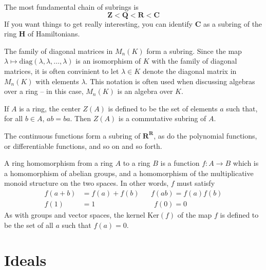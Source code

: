 \begin{example}
    The most fundamental chain of subrings is
    \[ \mathbf{Z} < \mathbf{Q} < \mathbf{R} < \mathbf{C} \]
    If you want things to get really interesting, you can identify $\mathbf{C}$ as a subring of the ring $\mathbf{H}$ of Hamiltonians.
\end{example}

\begin{example}
    The family of diagonal matrices in $M_n(K)$ form a subring. Since the map $\lambda \mapsto \text{diag}(\lambda, \lambda, \dots, \lambda)$ is an isomorphism of $K$ with the family of diagonal matrices, it is often convinient to let $\lambda \in K$ denote the diagonal matrix in $M_n(K)$ with elements $\lambda$. This notation is often used when discussing algebras over a ring -- in this case, $M_n(K)$ is an algebra over $K$.
\end{example}

\begin{example}
    If $A$ is a ring, the center $Z(A)$ is defined to be the set of elements $a$ such that, for all $b \in A$, $ab = ba$. Then $Z(A)$ is a commutative subring of $A$.
\end{example}

\begin{example}
    The continuous functions form a subring of $\mathbf{R}^\mathbf{R}$, as do the polynomial functions, or differentiable functions, and so on and so forth.
\end{example}

A ring homomorphism from a ring $A$ to a ring $B$ is a function $f:A \to B$ which is a homomorphism of abelian groups, and a homomorphism of the multiplicative monoid structure on the two spaces. In other words, $f$ must satisfy
%
\begin{align*}
    f(a + b) &= f(a) + f(b) && f(ab) = f(a)f(b)\\
    f(1) &= 1 && \ \ f(0) = 0
\end{align*}
%
As with groups and vector spaces, the kernel $\text{Ker}(f)$ of the map $f$ is defined to be the set of all $a$ such that $f(a) = 0$.





\section{Ideals}

